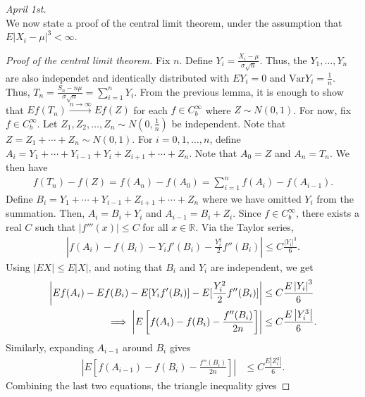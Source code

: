\documentclass[15pt,a4paper]{book}
\theoremstyle{definition}
\newcommand{\abs}[1]{\left| #1 \right|} %
\newcommand{\R}{\mathbb{R}}
\newcommand{\Var}{\text{Var}}
\newcommand{\toup}[1]{\xrightarrow{#1}}
\begin{document}
\textit{April 1st.}\\
We now state a proof of the central limit theorem, under the assumption that $E\abs{X_{i}-\mu}^{3} < \infty$.

\begin{proof}[Proof of the central limit theorem]
    Fix $n$. Define $Y_{i} = \frac{X_{i}-\mu}{\sigma \sqrt{n}}$. Thus, the $Y_{1},\ldots,Y_{n}$ are also independet and identically distributed with $EY_{i} = 0$ and $\Var Y_{i} = \frac{1}{n}$. Thus, $T_{n} = \frac{S_{n}-n\mu}{\sigma\sqrt{n}} = \sum_{i=1}^{n} Y_{i}$. From the previous lemma, it is enough to show that $Ef(T_{n}) \toup{n \to \infty} Ef(Z)$ for each $f \in C_{b}^{\infty}$ where $Z \sim N(0,1)$. For now, fix $f \in C_{b}^{\infty}$. Let $Z_{1},Z_{2},\ldots,Z_{n} \sim N(0,\frac{1}{n})$ be independent. Note that $Z = Z_{1} + \cdots + Z_{n} \sim N(0,1)$. For $i = 0,1,\ldots,n$, define $A_{i} = Y_{1} + \cdots + Y_{i-1} + Y_{i} + Z_{i+1} + \cdots + Z_{n}$. Note that $A_{0} = Z$ and $A_{n} = T_{n}$. We then have
    \begin{align}
        f(T_{n})-f(Z) = f(A_{n})-f(A_{0}) = \sum_{i=1}^{n} f(A_{i})-f(A_{i-1}).
    \end{align}
    Define $B_{i} = Y_{1} + \cdots + Y_{i-1} + Z_{i+1} + \cdots + Z_{n}$ where we have omitted $Y_{i}$ from the summation. Then, $A_{i} = B_{i} + Y_{i}$ and $A_{i-1} = B_{i} + Z_{i}$. Since $f \in C_{b}^{\infty}$, there exists a real $C$ such that $\abs{f'''(x)} \leq C$ for all $x \in \R$. Via the Taylor series,
    \begin{align}
        \abs{f(A_{i})-f(B_{i})-Y_{i}f'(B_{i})-\frac{Y_{i}^{2}}{2}f''(B_{i})} \leq C \frac{\abs{Y_{i}}^{3}}{6}.
    \end{align}
    Using $\abs{EX} \leq E\abs{X}$, and noting that $B_{i}$ and $Y_{i}$ are independent, we get
    \begin{align}
        \abs{Ef(A_{i})-Ef(B_{i}) - E[Y_{i}f'(B_{i})]-E[\frac{Y_{i}^{2}}{2} f''(B_{i})]} &\leq C \frac{E\abs{Y_{i}}^{3}}{6} \notag \\
        \implies \abs{E\left[f(A_{i})-f(B_{i})-\frac{f''(B_{i})}{2n}\right]} &\leq C \frac{E\abs{Y_{i}^{3}}}{6}.
    \end{align}
    Similarly, expanding $A_{i-1}$ around $B_{i}$ gives
    \begin{align}
        \abs{E\left[f(A_{i-1})-f(B_{i})-\frac{f''(B_{i})}{2n}\right]} &\leq C \frac{E\abs{Z_{i}^{3}}}{6}.
    \end{align}
    Combining the last two equations, the triangle inequality gives

\end{proof}
\end{document}
